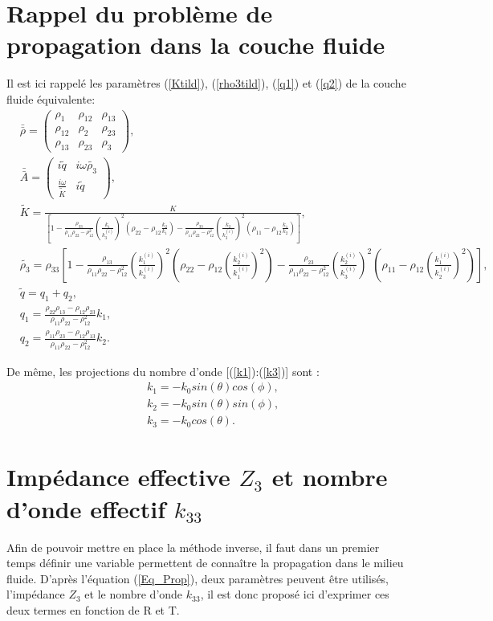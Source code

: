 \documentclass[12pt]{report}
\begin{document}
\section{Rappel du problème de propagation dans la couche fluide}
\label{Ch_Inv_S_Pb}
    Il est ici rappelé  les paramètres (\ref{Ktild}), (\ref{rho3tild}), (\ref{q1}) et (\ref{q2})  de la couche fluide équivalente:
    \begin{align*}
	    &\bar{\bar{\rho}}=\begin{pmatrix} \rho_1 & \rho_{12} & \rho_{13} \\ \rho_{12} & \rho_2 & \rho_{23} \\ \rho_{13} & \rho_{23} & \rho_3 \end{pmatrix},\\
        &\bar{\bar{A}}=\begin{pmatrix} i \tilde{q} & i \omega \tilde{\rho_3} \\ \frac{i \omega}{\tilde{K}} & i \tilde{q} \end{pmatrix},\\
	    &\tilde{K}=\frac{K}{[1-\frac{\rho_{33}}{\rho_{11}\rho_{22}-\rho_{12}^2}(\frac{k_1}{k_3^{(i)}})^2(\rho_{22}-\rho_{12}\frac{k_2}{k_1})-\frac{\rho_{33}}{\rho_{11}\rho_{22}-\rho_{12}^2}(\frac{k_2}{k_3^{(i)}})^2(\rho_{11}-\rho_{12}\frac{k_1}{k_2})]},\\
        &\tilde{\rho_3}=\rho_{33}[1-\frac{\rho_{13}}{\rho_{11}\rho_{22}-\rho_{12}^2}(\frac{k_1^{(i)}}{k_3^{(i)}})^2(\rho_{22}-\rho_{12}(\frac{k_2^{(i)}}{k_1^{(i)}})^2)-\frac{\rho_{23}}{\rho_{11}\rho_{22}-\rho_{12}^2}(\frac{k_2^{(i)}}{k_3^{(i)}})^2(\rho_{11}-\rho_{12}(\frac{k_1^{(i)}}{k_2^{(i)}})^2)], \\
        &\tilde{q}=q_1+q_2,\\
	    &q_{1}=\frac{\rho_{22}\rho_{13}-\rho_{12}\rho_{23}}{\rho_{11}\rho_{22}-\rho_{12}^2}k_1,\\
        &q_{2}= \frac{\rho_{11}\rho_{23}-\rho_{12}\rho_{13}}{\rho_{11}\rho_{22}-\rho_{12}^2}k_2.
    \end{align*}
    
    De même, les projections du nombre d'onde [(\ref{k1}):(\ref{k3})] sont :
    \begin{align*}
    &k_1=-k_0 sin(\theta) cos(\phi), \\
    &k_2=-k_0 sin(\theta) sin(\phi), \\
    &k_3= -k_0 cos(\theta).
    \end{align*}
          
     
\section{Impédance effective $Z_3$ et nombre d'onde effectif $k_{33}$}
\label{Ch_Inv_S_Z3}
Afin de pouvoir mettre en place la méthode inverse, il faut dans un premier temps définir une variable permettent de connaître la propagation dans le milieu fluide. D'après l'équation (\ref{Eq_Prop}), deux paramètres peuvent être utilisés, l'impédance $Z_3$ et le nombre d'onde $k_{33}$, il est donc proposé ici d'exprimer ces deux termes en fonction de R et T.
    
\end{document}

